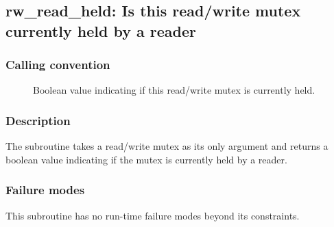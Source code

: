\clearpage
{}
{}
\label{subr:rw_read_held}
\subsection*{rw\_read\_held: Is this read/write mutex currently held by
  a reader}

\subsubsection*{Calling convention}

\begin{description}
\item[] Boolean value indicating if this read/write
  mutex is currently held.
\end{description}

\subsubsection*{Description}

The  subroutine takes a read/write mutex as its
only argument and returns a boolean value indicating if the mutex is
currently held by a reader.

\subsubsection*{Failure modes}

This subroutine has no run-time failure modes beyond its constraints.
